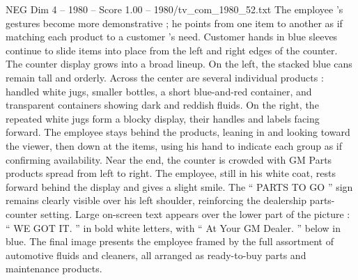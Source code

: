 \begin{textsample}{NEG Dim 4 – 1980 – Score 1.00 – 1980/tv\_com\_1980\_52.txt}
The employee ’s gestures become more demonstrative ; he points from one item to another as if matching each product to a customer ’s need.
Customer hands in blue sleeves continue to slide items into place from the left and right edges of the counter.
The counter display grows into a broad lineup.
On the left, the stacked blue cans remain tall and orderly.
Across the center are several individual products : handled white jugs, smaller bottles, a short blue-and-red container, and transparent containers showing dark and reddish fluids.
On the right, the repeated white jugs form a blocky display, their handles and labels facing forward.
The employee stays behind the products, leaning in and looking toward the viewer, then down at the items, using his hand to indicate each group as if confirming availability.
Near the end, the counter is crowded with GM Parts products spread from left to right.
The employee, still in his white coat, rests forward behind the display and gives a slight smile.
The “ PARTS TO GO ” sign remains clearly visible over his left shoulder, reinforcing the dealership parts-counter setting.
Large on-screen text appears over the lower part of the picture : “ WE GOT IT. ” in bold white letters, with “ At Your GM Dealer. ” below in blue.
The final image presents the employee framed by the full assortment of automotive fluids and cleaners, all arranged as ready-to-buy parts and maintenance products.

\end{textsample}
